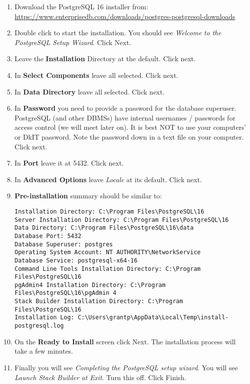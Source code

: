 \begin{enumerate}

\item
	Download the PostgreSQL 16 installer from:
	\url{https://www.enterprisedb.com/downloads/postgres-postgresql-downloads}

\item
	Double click to start the installation.
	You should see \textit{Welcome to the PostgreSQL Setup Wizard}.
	Click Next.
	
\item 
	Leave the \textbf{Installation} Directory at the default.
	Click next.
	
\item In \textbf{Select Components} leave all selected.
	Click next.
	
\item In \textbf{Data Directory} leave all selected.
	Click next.
	
\item In \textbf{Password} you need to provide a password for the database superuser.
	PostgreSQL (and other DBMSs) have internal usernames / passwords for access control (we will meet later on).
	It is best NOT to use your computers' or DkIT password.
	Note the password down in a text file on your computer.
	Click next.

\item In \textbf{Port} leave it at 5432.
	Click next.
	
\item In \textbf{Advanced Options} leave \textit{Locale} at its default.
	Click next.

\item \textbf{Pre-installation} summary should be similar to:
\begin{verbatim}
Installation Directory: C:\Program Files\PostgreSQL\16
Server Installation Directory: C:\Program Files\PostgreSQL\16
Data Directory: C:\Program Files\PostgreSQL\16\data
Database Port: 5432
Database Superuser: postgres
Operating System Account: NT AUTHORITY\NetworkService
Database Service: postgresql-x64-16
Command Line Tools Installation Directory: C:\Program Files\PostgreSQL\16
pgAdmin4 Installation Directory: C:\Program Files\PostgreSQL\16\pgAdmin 4
Stack Builder Installation Directory: C:\Program Files\PostgreSQL\16
Installation Log: C:\Users\grantp\AppData\Local\Temp\install-postgresql.log
\end{verbatim}

\item On the \textbf{Ready to Install} screen click Next.
	The installation process will take a few minutes.
	
\item Finally you will see \textit{Completing the PostgreSQL setup wizard}.
	You will see \textit{Launch Stack Builder at Exit}.
	Turn this off.
	Click Finish.
	

\end{enumerate}
	
